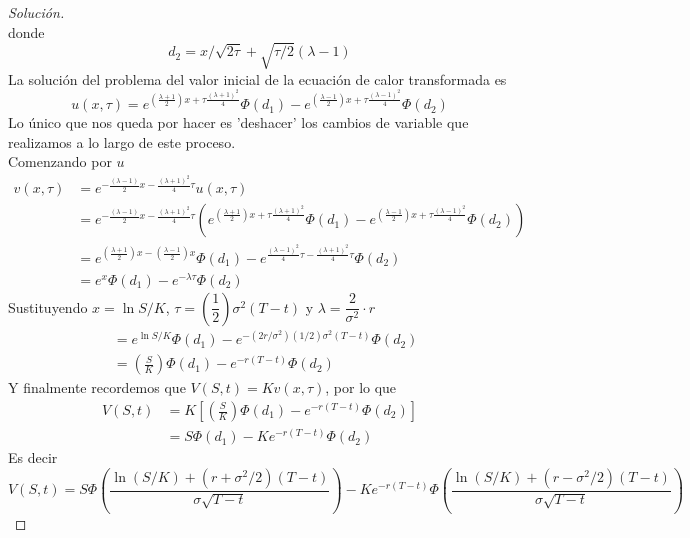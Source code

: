 \documentclass[11pt,notitlepage]{article}
\newenvironment{solucion}
  {\begin{proof}[Solución]}
  {\end{proof}}
\begin{document}
\begin{solucion}
\begin{equation*}
    \end{equation*}
    donde
    \begin{equation}
        \label{eq:d2}
        d_2 = x/\sqrt{2\tau} + \sqrt{\tau/2} (\lambda - 1)
    \end{equation}
    La solución del problema del valor inicial de la ecuación de calor transformada es
    \begin{equation*}
        u(x, \tau) = e^{\left(\frac{\lambda + 1}{2} \right) x + \tau \frac{(\lambda + 1)^2}{4}} \Phi(d_1) - e^{\left(\frac{\lambda - 1}{2} \right) x + \tau \frac{(\lambda - 1)^2}{4}} \Phi(d_2)
    \end{equation*}
    Lo único que nos queda por hacer es 'deshacer' los cambios de variable que realizamos a lo largo de este proceso.\\
    Comenzando por $u$
    \begin{align*}
        v(x, \tau) &= e^{-\frac{(\lambda - 1)}{2} x - \frac{(\lambda + 1)^2}{4} \tau} u(x, \tau)\\
        &= e^{-\frac{(\lambda - 1)}{2} x - \frac{(\lambda + 1)^2}{4} \tau} \left(e^{\left(\frac{\lambda + 1}{2} \right) x + \tau \frac{(\lambda + 1)^2}{4}} \Phi(d_1) - e^{\left(\frac{\lambda - 1}{2} \right) x + \tau \frac{(\lambda - 1)^2}{4}} \Phi(d_2) \right)\\
        &= e^{(\frac{\lambda + 1}{2})x - (\frac{\lambda - 1}{2})x} \Phi(d_1) - e^{\frac{(\lambda - 1)^2}{4}\tau - \frac{(\lambda + 1)^2}{4}\tau} \Phi(d_2)\\
        &= e^x \Phi(d_1) - e^{-\lambda \tau} \Phi(d_2)
    \end{align*}
    Sustituyendo $x = \ln{S/K}$, $\tau = \left(\dfrac{1}{2}\right) \sigma^2 (T-t)$ y $ \lambda = \dfrac{2}{\sigma^2} \cdot r$
    \begin{align*}
        &= e^{\ln{S/K}} \Phi(d_1) - e^{- (2r/\sigma^2)(1/2)\sigma^2(T-t)} \Phi(d_2)\\
        &= \left(\frac{S}{K}\right) \Phi(d_1) - e^{-r(T-t)} \Phi(d_2)
    \end{align*}
    Y finalmente recordemos que $V(S,t) = K v(x, \tau)$, por lo que
    \begin{align*}
        V(S,t) &= K \left[ \left(\frac{S}{K}\right) \Phi(d_1) - e^{-r(T-t)} \Phi(d_2) \right]\\
        &= S \Phi(d_1) - K e^{-r(T-t)} \Phi(d_2)
    \end{align*}
    Es decir
    \begin{equation*}
        V(S,t) = S \Phi\left( \frac{\ln{(S/K)} + (r + \sigma^2/2)(T-t)}{\sigma\sqrt{T-t}} \right) - K e^{-r(T-t)}\Phi\left( \frac{\ln{(S/K)} + (r - \sigma^2/2)(T-t)}{\sigma\sqrt{T-t}} \right)

\end{equation*}
\end{solucion}
\end{document}
